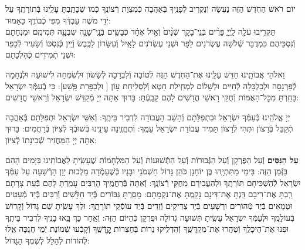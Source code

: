 \documentclass[twoside, openany, parskip=half, 11pt]{book}
\begin{document}
יוֹם רֹאשׁ הַחֹֽדֶשׁ
הַזֶּה נַעֲשֶׂה וְֿנַקְרִיב לְֿפָנֶֽיךָ בְּֿאַהֲבָה כְּֿמִצְוַת רְֿצוֹנֶֽךָ כְּֿמוֹ שֶׁכָּתַֽבְתָּ עָלֵֽינוּ בְּֿתוֹרָתֶֽךָ עַל יְֿדֵי מֹשֶׁה עַבְדְּֿךָ מִפִּי כְֿבוֹדֶֽךָ כָּאָמוּר:\\
תַּקְרִ֥יבוּ עֹלָ֖ה לַֽיְיָ֑ פָּרִ֨ים בְּֿנֵֽי־בָקָ֤ר שְֿׁנַ֨יִם֙ וְֿאַ֣יִל אֶחָ֔ד כְּֿבָשִׂ֧ים בְּֿנֵֽי־שָׁנָ֛ה שִׁבְעָ֖ה תְּֿמִימִֽם׃ וּמִנְחָתָם וְֿנִסְכֵּיהֶם כִּמְדֻבָּר שְֿׁלֹשָׁה עֶשְׂרֹנִים לַפָּר וּשְׁנֵי עֶשְׂרֹנִים לָאָֽיִל וְֿעִשָּׂרוֹן לַכֶּֽבֶשׂ וְֿיַֽיִן כְּֿנִסְכּוֹ וְֿשָׂעִיר לְֿכַפֵּר וּשְׁנֵי תְֿמִידִים כְּֿהִלְכָתָם:

וֵאלֹהֵי אֲבוֹתֵֽינוּ חַדֵּשׁ עָלֵֽינוּ אֶת־הַחֹֽדֶשׁ הַזֶּה לְֿטוֹבָה וְֿלִבְרָכָה לְֿשָׂשׂוֹן וּלְשִׂמְחָה לִישׁוּעָה וּלְנֶחָמָה לְֿפַרְנָסָה וּלְכַלְכָּלָה לְֿחַיִּים וּלְשָׁלוֹם לִמְחִֽילַת חֵטְא וְֿלִסְלִיחַת עָוֹן [
וּלְכַפָּרַת פָּֽשַׁע]: כִּי בְֿעַמְּֿךָ יִשְׂרָאֵל בָּחַֽרְתָּ מִכׇּל־הָאֻמּוֹת וְֿחֻקֵּי רָאשֵׁי חֳדָשִׁים לָהֶם קָבָֽעְֿתָּ: בָּרוּךְ אַתָּה יְיָ מְֿקַדֵּשׁ יִשְׂרָאֵל וְֿרָאשֵׁי חֳדָשִׁים:

יְיָ אֱלֹהֵֽינוּ בְּֿעַמְּֿךָ יִשְׂרָאֵל וּבִתְפִלָּתָם וְֿהָשֵׁב הָעֲבוֹדָה לִדְבִיר בֵּיתֶֽךָ: וְֿאִשֵּׁי יִשְׂרָאֵל וּתְפִלָּתָם בְּֿאַהֲבָה תְֿקַבֵּל בְּֿרָצוֹן וּתְהִי לְֿרָצוֹן תָּמִיד עֲבוֹדַת יִשְׂרָאֵל עַמֶּֽךָ: וְֿתֶחֱזֶֽינָה עֵינֵֽינוּ בְּֿשׁוּבְֿךָ לְֿצִיּוֹן בְּֿרַחֲמִים: בָּרוּךְ אַתָּה יְיָ הַמַּחֲזִיר שְֿׁכִינָתוֹ לְֿצִיּוֹן:

\modim

\enlargethispage{\baselineskip}

\begin{sometimes}

\textbf{עַל הַנִּסִּים}
וְֿעַל הַפֻּרְקָן וְֿעַל הַגְּֿבוּרוֹת וְֿעַל הַתְּֿשׁוּעוֹת וְֿעַל הַמִּלְחָמוֹת
שֶׁעָשִֽׂיתָ לַאֲבוֹתֵֽינוּ בַּיָּמִים הָהֵם בַּזְּֿמַן הַזֶּה:
בִּימֵי מַתִּתְיָֽהוּ בֶּן יוֹחָנָן כֹּהֵן גָּדוֹל חַשְׁמֹנַי וּבָנָיו כְּֿשֶׁעָמְֿדָה מַלְכוּת יָוָן הָרְֿשָׁעָה עַל עַמְּֿךָ יִשְׂרָאֵל לְֿהַשְׁכִּיחָם תּוֹרָתֶֽךָ וּלְהַעֲבִירָם מֵחֻקֵּי רְֿצוֹנֶֽךָ: וְֿאַתָּה בְּֿרַחֲמֶֽיךָ הָרַבִּים עָמַֽדְתָּ לָהֶם בְּֿעֵת צָרָתָם רַֽבְתָּ אֶת־רִיבָם דַּֽנְתָּ אֶת־דִּינָם נָקַֽמְתָּ אֶת־נִקְמָתָם: מָסַֽרְתָּ גִּבּוֹרִים בְּֿיַד חַלָּשִׁים וְֿרַבִּים בְּֿיַד מְֿעַטִּים וּטְמֵאִים בְּֿיַד טְֿהוֹרִים וּרְשָׁעִים בְּֿיַד צַדִּיקִים וְֿזֵדִים בְּֿיַד עוֹסְֿקֵי תוֹרָתֶֽךָ: וּלְךָ עָשִֽׂיתָ שֵׁם גָּדוֹל וְֿקָדוֹשׁ בְּֿעוֹלָמֶֽךָ וּלְעַמְּֿךָ יִשְׂרָאֵל עָשִֽׂיתָ תְּֿשׁוּעָה גְֿדוֹלָה וּפֻרְקָן כְּֿהַיּוֹם הַזֶּה: וְֿאַֽחַר כַּךְ בָּֽאוּ בָנֶֽיךָ לִדְבִיר בֵּיתֶֽךָ וּפִנּוּ אֶת־הֵיכָלֶֽךָ וְֿטִהֲרוּ אֶת־מִקְדָּשֶֽׁךָ וְֿהִדְלִֽיקוּ נֵרוֹת בְּֿחַצְרוֹת קׇׇׇׇׇׇׇׇׇׇׇׇׇׇָדְּֿשֶֽׁךָ וְֿקָבְֿעוּ שְֿׁמוֹנַת יְֿמֵי חֲנֻכָּה אֵֽלּוּ לְֿהוֹדוֹת לְֿהַלֵּל לְֿשִׁמְךָ הַגָּדוֹל:

\end{sometimes}
\end{document}
